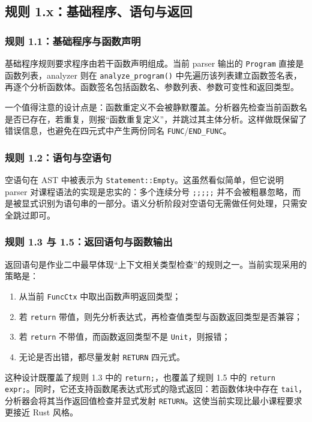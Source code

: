 \documentclass[UTF8,a4paper,12pt]{ctexart}
\newcommand{\pkg}[1]{\texttt{#1}}
\newcommand{\op}[1]{\texttt{#1}}
\begin{document}
\subsection{规则 1.x：基础程序、语句与返回}

\subsubsection{规则 1.1：基础程序与函数声明}

基础程序规则要求程序由若干函数声明组成。当前 parser 输出的 \pkg{Program} 直接是函数列表，analyzer 则在 \pkg{analyze\_program()} 中先遍历该列表建立函数签名表，再逐个分析函数体。函数签名包括函数名、参数列表、参数可变性和返回类型。

一个值得注意的设计点是：函数重定义不会被静默覆盖。分析器先检查当前函数名是否已存在，若重复，则报“函数重复定义”，并跳过其主体分析。这样做既保留了错误信息，也避免在四元式中产生两份同名 \op{FUNC}/\op{END\_FUNC}。

\subsubsection{规则 1.2：语句与空语句}

空语句在 AST 中被表示为 \pkg{Statement::Empty}。这虽然看似简单，但它说明 parser 对课程语法的实现是忠实的：多个连续分号 \pkg{;;;;;} 并不会被粗暴忽略，而是被显式识别为语句串的一部分。语义分析阶段对空语句无需做任何处理，只需安全跳过即可。

\subsubsection{规则 1.3 与 1.5：返回语句与函数输出}

返回语句是作业二中最早体现“上下文相关类型检查”的规则之一。当前实现采用的策略是：

\begin{enumerate}[label=\arabic*.]
    \item 从当前 \pkg{FuncCtx} 中取出函数声明返回类型；
    \item 若 \pkg{return} 带值，则先分析表达式，再检查值类型与函数返回类型是否兼容；
    \item 若 \pkg{return} 不带值，而函数返回类型不是 \pkg{Unit}，则报错；
    \item 无论是否出错，都尽量发射 \op{RETURN} 四元式。
\end{enumerate}

这种设计既覆盖了规则 1.3 中的 \pkg{return;}，也覆盖了规则 1.5 中的 \pkg{return expr;}。同时，它还支持函数尾表达式形式的隐式返回：若函数体块中存在 \pkg{tail}，分析器会将其当作返回值检查并显式发射 \op{RETURN}。这使当前实现比最小课程要求更接近 Rust 风格。
\end{document}
